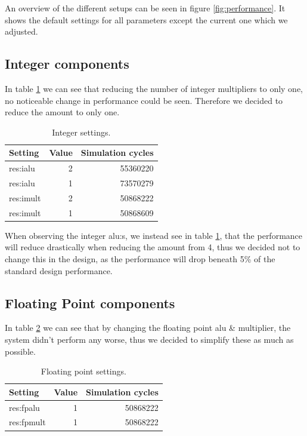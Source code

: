 \documentclass[titlepage, a4paper]{article}
\begin{document}
An overview of the different setups can be seen in figure \ref{fig:performance}. It shows the default settings for all parameters except the current one which we adjusted.

\subsection{Integer components}
In table \ref{tab:integer} we can see that reducing the number of integer multipliers to only one, no noticeable change in performance could be seen. Therefore we decided to reduce the amount to only one.

\begin{table}[H]
\centering
\caption{Integer settings.}

\begin{tabular}{|l|r|r|}
  \hline
  \textbf{Setting} & \textbf{Value} & \textbf{Simulation cycles}\\ \hline
  res:ialu & 2 & 55360220 \\ \hline
  res:ialu & 1 & 73570279 \\ \hline
  res:imult & 2 & 50868222 \\ \hline
  res:imult & 1 & 50868609 \\ \hline
\end{tabular}

\label{tab:integer}
\end{table}

When observing the integer alu:s, we instead see in table \ref{tab:integer}, that the performance will reduce drastically when reducing the amount from 4, thus we decided not to change this in the design, as the performance will drop beneath 5\% of the standard design performance.

\subsection{Floating Point components}
In table \ref{tab:floatingpoint} we can see that by changing the floating point alu \& multiplier, the system didn't perform any worse, thus we decided to simplify these as much as possible.

\begin{table}[H]
\centering
\caption{Floating point settings.}

\begin{tabular}{|l|r|r|}
  \hline
  \textbf{Setting} & \textbf{Value} & \textbf{Simulation cycles}\\ \hline
  res:fpalu & 1 & 50868222 \\ \hline
  res:fpmult & 1 & 50868222 \\ \hline
\end{tabular}

\label{tab:floatingpoint}
\end{table}
\end{document}
